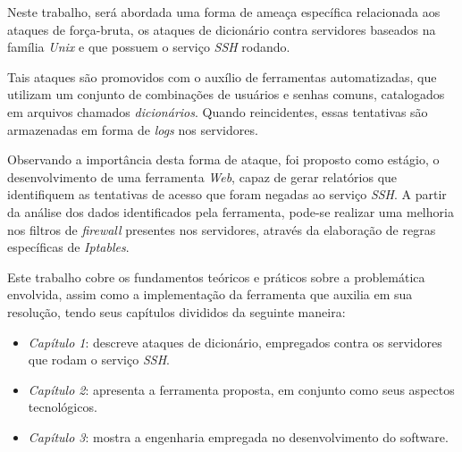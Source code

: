 Neste trabalho, será abordada uma forma de ameaça específica relacionada aos ataques de força-bruta, os ataques de dicionário contra servidores baseados na família \textit{Unix} e que possuem o serviço \textit{SSH} rodando.

Tais ataques são promovidos com o auxílio de ferramentas automatizadas, que utilizam um conjunto de combinações de usuários e senhas comuns, catalogados em arquivos chamados  \textit{dicionários}. Quando reincidentes, essas tentativas são armazenadas em forma de \textit{logs} nos servidores.

Observando a importância desta forma de ataque, foi proposto como estágio, o desenvolvimento de uma ferramenta \textit{Web}, capaz de gerar relatórios que identifiquem as tentativas de acesso que foram negadas ao serviço \textit{SSH}. A partir da análise dos dados identificados pela ferramenta, pode-se realizar uma melhoria nos filtros de \textit{firewall} presentes nos servidores, através da elaboração de regras específicas de \textit{Iptables}.

Este trabalho cobre os fundamentos teóricos e práticos sobre a problemática envolvida, assim como a implementação da ferramenta que auxilia em sua resolução, tendo seus capítulos divididos da seguinte maneira:

\begin{itemize}
    \item \textit{Capítulo 1}: descreve ataques de dicionário, empregados contra os servidores que rodam o serviço \textit{SSH}.
    \item \textit{Capítulo 2}: apresenta a ferramenta proposta, em conjunto como seus aspectos tecnológicos.
    \item \textit{Capítulo 3}: mostra a engenharia empregada no desenvolvimento do software.
\end{itemize}

